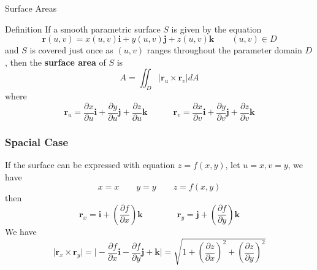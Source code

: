 \documentclass{beamer}
\begin{document}
\begin{frame}{Surface Areas}
    \begin{block}{Definition}
        If a smooth parametric surface $S$ is given by the equation
         \begin{equation*}
            \boldsymbol{r}(u,v)=x(u,v)\boldsymbol{i}+y(u,v)\boldsymbol{j}+z(u,v)\boldsymbol{k} \qquad (u,v)\in D
        \end{equation*}
        and $S$ is covered just once as $(u,v)$ ranges throughout the parameter domain $D$, then the \textbf{surface area} of $S$ is
        \begin{equation*}
            A=\iint_D \big|\boldsymbol{r}_u\times\boldsymbol{r}_v\big|dA
        \end{equation*}
        where
        \begin{equation*}
            \boldsymbol{r}_u=\frac{\partial x}{\partial u}\boldsymbol{i}+\frac{\partial y}{\partial u}\boldsymbol{j}+\frac{\partial z}{\partial u}\boldsymbol{k} \quad \qquad \boldsymbol{r}_v=\frac{\partial x}{\partial v}\boldsymbol{i}+\frac{\partial y}{\partial v}\boldsymbol{j}+\frac{\partial z}{\partial v}\boldsymbol{k}
        \end{equation*}
    \end{block}
\end{frame}

\begin{frame}
    \frametitle{Spacial Case}
    \begin{block}
        If the surface can be expressed with equation $z=f(x,y)$, let $u=x,v=y$, we have
        \begin{equation*}
            x=x \qquad y=y \qquad z=f(x,y)
        \end{equation*}
        then
        \begin{equation*}
            \boldsymbol{r}_x=\boldsymbol{i}+(\frac{\partial f}{\partial x})\boldsymbol{k} \qquad \qquad \boldsymbol{r}_y=\boldsymbol{j}+(\frac{\partial f}{\partial y})\boldsymbol{k}
        \end{equation*}
        We have
        \begin{equation*}
            \big|\boldsymbol{r}_x\times\boldsymbol{r}_y\big|=\big|-\frac{\partial f}{\partial x}\boldsymbol{i}-\frac{\partial f}{\partial y}\boldsymbol{j}+\boldsymbol{k}\big|=\sqrt{1+(\frac{\partial z}{\partial x})^2+(\frac{\partial z}{\partial y})^2}
        \end{equation*}
    \end{block}
    
\end{frame}
\end{document}
